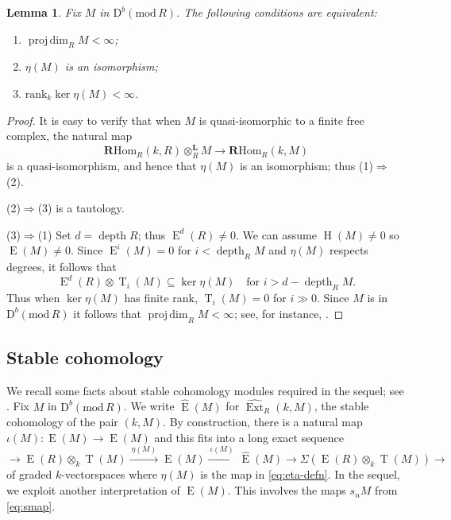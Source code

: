\documentclass{amsart}
\numberwithin{equation}{section}
\theoremstyle{plain}
\newtheorem{lemma}[equation]{Lemma}
\theoremstyle{definition}
\theoremstyle{remark}
\newcommand{\dbcat}[1]{\mathrm{D}^b(\mathrm{mod}\,{#1})}
\newcommand{\depth}{\operatorname{depth}}
\newcommand{\eee}{\operatorname{E}}
\newcommand{\ext}{\operatorname{Ext}}
\newcommand{\hh}{\operatorname{H}}
\newcommand{\lotimes}{\otimes^{\mathbf L}}
\newcommand{\projdim}{\operatorname{proj\,dim}}
\newcommand{\rank}{\mathrm{rank}}
\newcommand{\rhom}{\mathbf{R}\mathrm{Hom}}
\newcommand{\tee}{\operatorname{T}}
\begin{document}
 \begin{lemma}
     \label{le:eta-iso}
    Fix $M$ in $\dbcat R$. The following conditions are equivalent:
    \begin{enumerate}[\quad\rm(1)]
        \item $\projdim_RM<\infty$;
        \item  $\eta(M)$ is an isomorphism;
        \item $\rank_k\ker\eta(M)<\infty$.
    \end{enumerate}
 \end{lemma}

 \begin{proof}
 It is easy to verify that when $M$ is quasi-isomorphic to a finite free complex, the natural map
     \[
     \rhom_R(k,R)\lotimes_R M\longrightarrow \rhom_R(k,M)
     \]
     is a quasi-isomorphism, and hence that $\eta(M)$ is an isomorphism; thus (1)$\Rightarrow$(2).

     (2)$\Rightarrow$(3) is a tautology.

     (3)$\Rightarrow$(1) Set $d=\depth R$; thus $\eee^d(R)\ne 0$. We can assume $\hh(M)\ne 0$ so $\eee(M)\ne 0$. Since  $\eee^i(M)=0$ for $i<\depth_RM$ and $\eta(M)$ respects degrees, it follows that
     \[
     \eee^d(R)\otimes \tee_i(M)\subseteq \ker\eta(M)\quad\text{for $i>d-\depth_RM$.}
     \]
     Thus when $\ker\eta(M)$ has finite rank, $\tee_i(M)=0$ for $i\gg 0$. Since $M$ is in $\dbcat R$ it follows that $\projdim_RM<\infty$; see, for instance, \cite[Proposition~5.3.P.]{Avramov/Foxby:1991a}.
 \end{proof}
   
\subsection*{Stable cohomology}
We recall some facts about stable cohomology modules required in the sequel; see \cite{Avramov/Iyengar:2013s, Avramov/Veliche:2007}. Fix $M$ in $\dbcat R$. We write $\widehat{\eee}(M)$ for $\widehat{\ext}_R(k,M)$, the stable cohomology of the pair $(k,M)$.  By construction, there is a natural map $\iota(M)\colon \eee(M)\to \widehat{\eee}(M)$ and this fits into a long exact sequence 
\begin{equation}
\label{eq:scfunctor}
\to \eee(R)\otimes_k \tee(M)\xrightarrow{\ \eta(M)\ } \eee(M)\xrightarrow{\ \iota(M)\ } \widehat{\eee}(M)\to \Sigma (\eee(R)\otimes_k \tee(M))\to 
\end{equation}
of  graded $k$-vectorspaces where $\eta(M)$ is the map in \eqref{eq:eta-defn}. In the sequel, we exploit another interpretation of $\widehat{\eee}(M)$. This involves the maps $s_nM$ from \eqref{eq:smap}.
\end{document}
